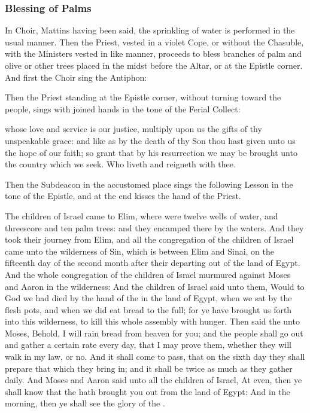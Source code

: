 \subsubsection{Blessing of Palms}
\begin{rubric}
In Choir, Mattins having been said, the sprinkling of water is performed in the usual manner. Then the Priest, vested in a violet Cope, or without the Chasuble, with the Ministers vested in like manner, proceeds to bless branches of palm and olive or other trees placed in the midst before the Altar, or at the Epistle corner. And first the Choir sing the Antiphon:
\end{rubric}
\begin{rubric}
    Then the Priest standing at the Epistle corner, without turning toward the people, sings with joined hands in the tone of the Ferial Collect:
\end{rubric}

{} whose love and service is our justice, multiply upon us the gifts of thy unspeakable grace: and like as by the death of thy Son thou hast given unto us the hope of our faith; so grant that by his resurrection we may be brought unto the country which we seek. Who liveth and reigneth with thee.

\begin{rubric}
    Then the Subdeacon in the accustomed place sings the following Lesson in the tone of the Epistle, and at the end kisses the hand of the Priest.
\end{rubric}

 The children of Israel came to Elim, where were twelve wells of water, and threescore and ten palm trees: and they encamped there by the waters. And they took their journey from Elim, and all the congregation of the children of Israel came unto the wilderness of Sin, which is between Elim and Sinai, on the fifteenth day of the second month after their departing out of the land of Egypt. And the whole congregation of the children of Israel murmured against Moses and Aaron in the wilderness: And the children of Israel said unto them, Would to God we had died by the hand of the  in the land of Egypt, when we sat by the flesh pots, and when we did eat bread to the full; for ye have brought us forth into this wilderness, to kill this whole assembly with hunger. Then said the  unto Moses, Behold, I will rain bread from heaven for you; and the people shall go out and gather a certain rate every day, that I may prove them, whether they will walk in my law, or no. And it shall come to pass, that on the sixth day they shall prepare that which they bring in; and it shall be twice as much as they gather daily. And Moses and Aaron said unto all the children of Israel, At even, then ye shall know that the  hath brought you out from the land of Egypt: And in the morning, then ye shall see the glory of the .


